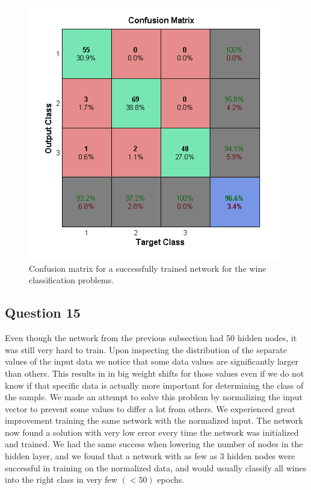 \documentclass[a4paper]{article}
\begin{document}
\begin{figure}[h!] %
    \includegraphics[]{wine_classification.png}
    \caption{\label{fig:wine_classification}Confusion matrix for a successfully trained network for the wine classification problems.}
\end{figure}

\subsection*{Question 15}
Even though the network from the previous subsection had 50 hidden nodes, it was 
still very hard to train. Upon inspecting the distribution of the separate values 
of the input data we notice that some data values are significantly larger 
than others. This results in in big weight shifts for those values 
even if we do not know if that specific 
data is actually more important for determining the class of the 
sample. We made an attempt to solve this problem by 
normalizing the input vector to prevent 
some values to differ a lot from others. 
We experienced great improvement training the same network with the 
normalized input. The 
network now found a solution with very low error every time the network was initialized 
and trained. We had the same success when lowering the number of nodes in the hidden layer, 
and we found that a network with as few as 3 hidden nodes were successful in training on the 
normalized data, and would usually classify all wines into the right class in very 
few $(<50)$ epochs.
\end{document}
